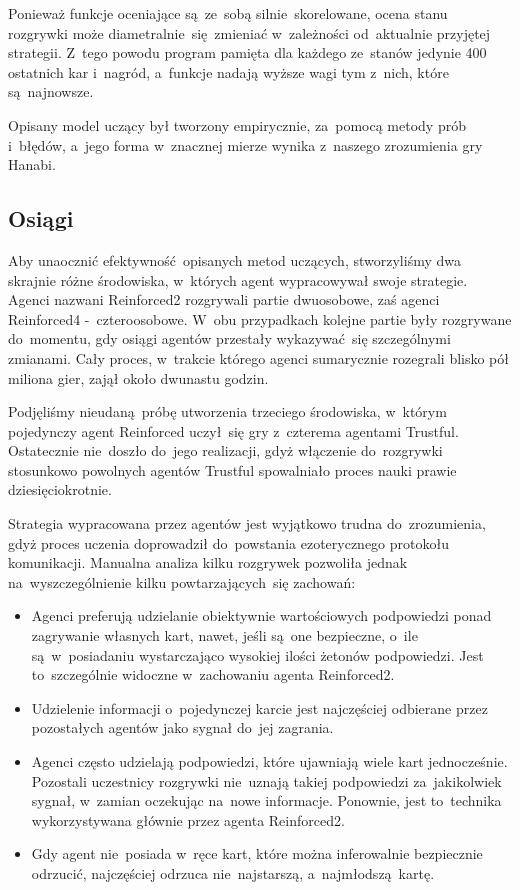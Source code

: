 \documentclass[declaration,shortabstract,inz]{iithesis}
\begin{document}
Ponieważ funkcje oceniające są~ze~sobą silnie skorelowane, ocena stanu rozgrywki może diametralnie~się zmieniać w~zależności od~aktualnie przyjętej strategii. Z~tego powodu program pamięta dla każdego ze~stanów jedynie 400 ostatnich kar i~nagród, a~funkcje nadają wyższe wagi tym z~nich, które są~najnowsze.

Opisany model uczący był tworzony empirycznie, za~pomocą metody prób i~błędów, a~jego forma w~znacznej mierze wynika z~naszego zrozumienia gry Hanabi.

\subsection*{Osiągi}

Aby unaocznić efektywność opisanych metod uczących, stworzyliśmy dwa skrajnie różne środowiska, w~których agent wypracowywał swoje strategie. Agenci nazwani Reinforced2 rozgrywali partie dwuosobowe, zaś agenci Reinforced4 -~czteroosobowe. W~obu przypadkach kolejne partie były rozgrywane do~momentu, gdy osiągi agentów przestały wykazywać~się szczególnymi zmianami. Cały proces, w~trakcie którego agenci sumarycznie rozegrali blisko pół miliona gier, zajął około dwunastu godzin.

Podjęliśmy nieudaną próbę utworzenia trzeciego środowiska, w~którym pojedynczy agent Reinforced uczył~się gry z~czterema agentami Trustful. Ostatecznie nie~doszło do~jego realizacji, gdyż włączenie do~rozgrywki stosunkowo powolnych agentów Trustful spowalniało proces nauki prawie dziesięciokrotnie.

Strategia wypracowana przez agentów jest wyjątkowo trudna do~zrozumienia, gdyż proces uczenia doprowadził do~powstania ezoterycznego protokołu komunikacji. Manualna analiza kilku rozgrywek pozwoliła jednak na~wyszczególnienie kilku powtarzających~się zachowań:
\begin{itemize}
	\item Agenci preferują udzielanie obiektywnie wartościowych podpowiedzi ponad zagrywanie własnych kart, nawet, jeśli są~one bezpieczne, o~ile są~w~posiadaniu wystarczająco wysokiej ilości żetonów podpowiedzi. Jest to~szczególnie widoczne w~zachowaniu agenta Reinforced2.
	\item Udzielenie informacji o~pojedynczej karcie jest najczęściej odbierane przez pozostałych agentów jako sygnał do~jej zagrania.
	\item Agenci często udzielają podpowiedzi, które ujawniają wiele kart jednocześnie. Pozostali uczestnicy rozgrywki nie~uznają takiej podpowiedzi za~jakikolwiek sygnał, w~zamian oczekując na~nowe informacje. Ponownie, jest to~technika wykorzystywana głównie przez agenta Reinforced2.
	\item Gdy agent nie~posiada w~ręce kart, które można inferowalnie bezpiecznie odrzucić, najczęściej odrzuca nie~najstarszą, a~najmłodszą kartę.
\end{itemize}
\end{document}
